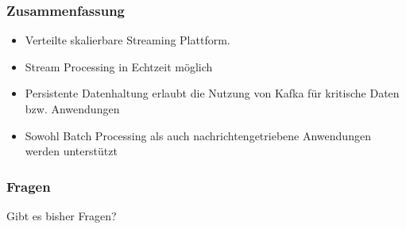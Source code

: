 \begin{frame}
\frametitle{Zusammenfassung}



	\begin{itemize}
		\item Verteilte skalierbare Streaming Plattform.
		\item Stream Processing in Echtzeit möglich
		\item Persistente Datenhaltung erlaubt die Nutzung von Kafka für kritische Daten bzw. Anwendungen
		\item Sowohl Batch Processing als auch nachrichtengetriebene Anwendungen werden unterstützt
	\end{itemize}

\end{frame}

\begin{frame}
\frametitle{Fragen}
\begin{center}
\Large{Gibt es bisher Fragen?}
\end{center}
\end{frame}